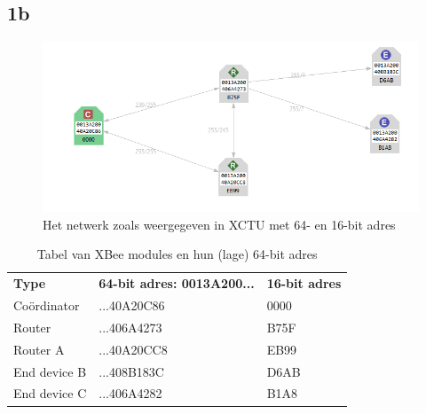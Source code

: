 \documentclass[12pt]{article}
\begin{document}
\subsection*{1b}

\begin{figure}[h]
\begin{center}
\includegraphics[scale=.8]{API_network.PNG}
\caption{Het netwerk zoals weergegeven in XCTU met 64- en 16-bit adres}
\label{fig:api_net}
\end{center}
\end{figure}
\begin{table}[h]
\begin{center}
\begin{tabular}{lll}
\rowcolor[HTML]{656565} 
\textbf{Type} 	  & \textbf{64-bit adres: 0013A200...} & \textbf{16-bit adres}\\
Co\"{o}rdinator   & ...40A20C86       &  0000	\\
Router            & ...406A4273       &  B75F  \\
Router A      	  & ...40A20CC8       &  EB99  \\
End device B      	  & ...408B183C       & D6AB   \\
End device C      	  & ...406A4282       &	B1A8	\\               
\end{tabular}
\end{center}
\caption{Tabel van XBee modules en hun (lage) 64-bit adres}
\label{tab:info1}
\end{table}
\clearpage
\end{document}
